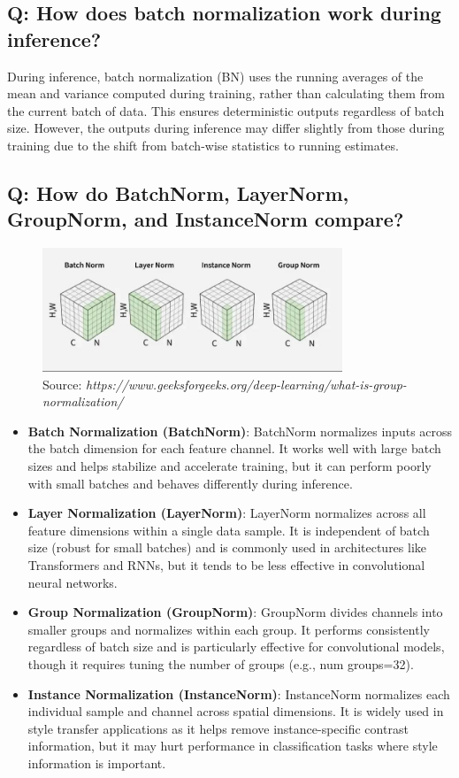 \subsection*{Q: How does batch normalization work during inference?}
During inference, batch normalization (BN) uses the running averages of the mean and variance computed during training, rather than calculating them from the current batch of data. This ensures deterministic outputs regardless of batch size. However, the outputs during inference may differ slightly from those during training due to the shift from batch-wise statistics to running estimates.

\subsection*{Q: How do BatchNorm, LayerNorm, GroupNorm, and InstanceNorm compare?}
\begin{figure}[H]
	\centering
	\includegraphics[width=0.8\textwidth]{norms.jpg}
	\caption{Source: \textit{https://www.geeksforgeeks.org/deep-learning/what-is-group-normalization/}}
\end{figure}
\begin{itemize}
	\item \textbf{Batch Normalization (BatchNorm)}: BatchNorm normalizes inputs across the batch dimension for each feature channel. It works well with large batch sizes and helps stabilize and accelerate training, but it can perform poorly with small batches and behaves differently during inference.
	\item \textbf{Layer Normalization (LayerNorm)}: LayerNorm normalizes across all feature dimensions within a single data sample. It is independent of batch size (robust for small batches) and is commonly used in architectures like Transformers and RNNs, but it tends to be less effective in convolutional neural networks.
	\item \textbf{Group Normalization (GroupNorm)}: GroupNorm divides channels into smaller groups and normalizes within each group. It performs consistently regardless of batch size and is particularly effective for convolutional models, though it requires tuning the number of groups (e.g., num groups=32).
	\item \textbf{Instance Normalization (InstanceNorm)}: InstanceNorm normalizes each individual sample and channel across spatial dimensions. It is widely used in style transfer applications as it helps remove instance-specific contrast information, but it may hurt performance in classification tasks where style information is important.
\end{itemize}

